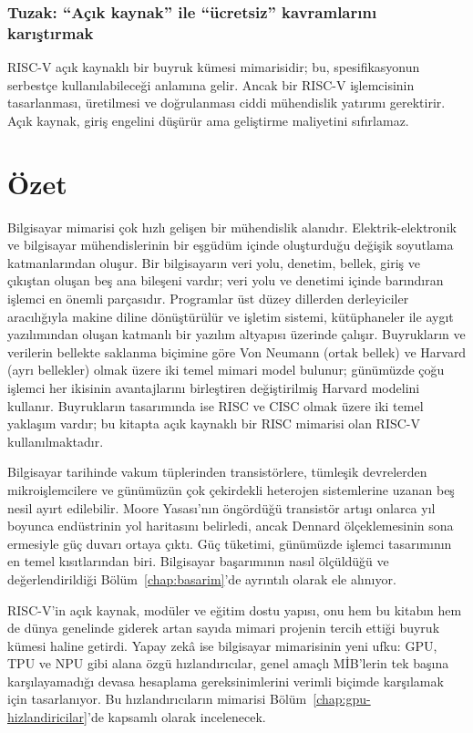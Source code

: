\subsubsection*{Tuzak: ``Açık kaynak'' ile ``ücretsiz'' kavramlarını karıştırmak}
RISC-V açık kaynaklı bir buyruk kümesi mimarisidir; bu, spesifikasyonun serbestçe kullanılabileceği anlamına gelir. Ancak bir RISC-V işlemcisinin tasarlanması, üretilmesi ve doğrulanması ciddi mühendislik yatırımı gerektirir. Açık kaynak, giriş engelini düşürür ama geliştirme maliyetini sıfırlamaz.


\section{Özet}
\label{sec:giris-ozet}

Bilgisayar mimarisi çok hızlı gelişen bir mühendislik alanıdır. Elektrik-elektronik ve bilgisayar mühendislerinin bir eşgüdüm içinde oluşturduğu değişik soyutlama katmanlarından oluşur. Bir bilgisayarın veri yolu, denetim, bellek, giriş ve çıkıştan oluşan beş ana bileşeni vardır; veri yolu ve denetimi içinde barındıran işlemci en önemli parçasıdır. Programlar üst düzey dillerden derleyiciler aracılığıyla makine diline dönüştürülür ve işletim sistemi, kütüphaneler ile aygıt yazılımından oluşan katmanlı bir yazılım altyapısı üzerinde çalışır. Buyrukların ve verilerin bellekte saklanma biçimine göre Von Neumann (ortak bellek) ve Harvard (ayrı bellekler) olmak üzere iki temel mimari model bulunur; günümüzde çoğu işlemci her ikisinin avantajlarını birleştiren değiştirilmiş Harvard modelini kullanır. Buyrukların tasarımında ise RISC ve CISC olmak üzere iki temel yaklaşım vardır; bu kitapta açık kaynaklı bir RISC mimarisi olan RISC-V kullanılmaktadır.

Bilgisayar tarihinde vakum tüplerinden transistörlere, tümleşik devrelerden mikroişlemcilere ve günümüzün çok çekirdekli heterojen sistemlerine uzanan beş nesil ayırt edilebilir. Moore Yasası'nın öngördüğü transistör artışı onlarca yıl boyunca endüstrinin yol haritasını belirledi, ancak Dennard ölçeklemesinin sona ermesiyle güç duvarı ortaya çıktı. Güç tüketimi, günümüzde işlemci tasarımının en temel kısıtlarından biri. Bilgisayar başarımının nasıl ölçüldüğü ve değerlendirildiği Bölüm~\ref{chap:basarim}'de ayrıntılı olarak ele alınıyor.

RISC-V'in açık kaynak, modüler ve eğitim dostu yapısı, onu hem bu kitabın hem de dünya genelinde giderek artan sayıda mimari projenin tercih ettiği buyruk kümesi haline getirdi. Yapay zekâ ise bilgisayar mimarisinin yeni ufku: GPU, TPU ve NPU gibi alana özgü hızlandırıcılar, genel amaçlı MİB'lerin tek başına karşılayamadığı devasa hesaplama gereksinimlerini verimli biçimde karşılamak için tasarlanıyor. Bu hızlandırıcıların mimarisi Bölüm~\ref{chap:gpu-hizlandiricilar}'de kapsamlı olarak incelenecek.

